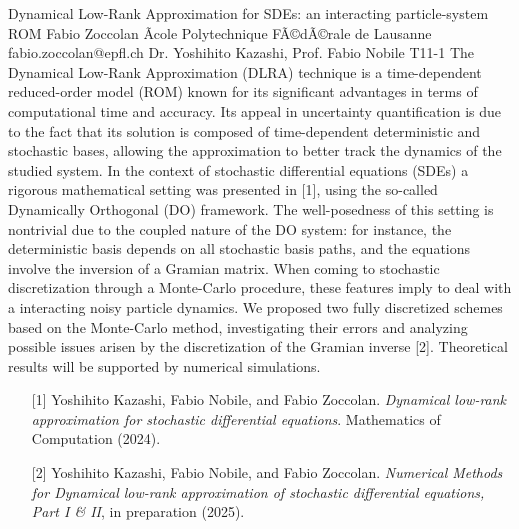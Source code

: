 \begin{talk}
  {Dynamical Low-Rank Approximation for SDEs: an interacting particle-system ROM}%
  {Fabio Zoccolan}%
  {Ãcole Polytechnique FÃ©dÃ©rale de Lausanne}%
  {fabio.zoccolan@epfl.ch}%
  {Dr. Yoshihito Kazashi, Prof. Fabio Nobile}%
  {T11-1}%
The Dynamical Low-Rank Approximation (DLRA) technique is a time-dependent reduced-order model (ROM) known for its significant advantages in terms of computational time and accuracy. Its appeal in uncertainty quantification is due to the fact that its solution is composed of time-dependent deterministic and stochastic bases, allowing the approximation to better track the dynamics of the studied system. In the context of stochastic differential equations (SDEs) a rigorous mathematical setting was presented in [1], using the so-called Dynamically Orthogonal (DO) framework. The well-posedness of this setting is nontrivial due to the coupled nature of the DO system: for instance, the deterministic basis depends on all stochastic basis paths, and the equations involve the inversion of a Gramian matrix. When coming to stochastic discretization through a Monte-Carlo procedure, these features imply to deal with a interacting noisy particle dynamics. We proposed two fully discretized schemes based on the Monte-Carlo method, investigating their errors and analyzing possible issues arisen by the discretization of the Gramian inverse [2]. Theoretical results will be supported by numerical simulations.

\medskip
\begin{enumerate}
	\item[{[1]}] Yoshihito Kazashi, Fabio Nobile, and Fabio Zoccolan. {\it Dynamical low-rank approximation for stochastic differential equations}. Mathematics of Computation (2024).
	\item[{[2]}] Yoshihito Kazashi, Fabio Nobile, and Fabio Zoccolan. {\it Numerical Methods for Dynamical low-rank approximation of stochastic differential equations, Part I \& II}, in preparation (2025).
\end{enumerate}

\end{talk}

